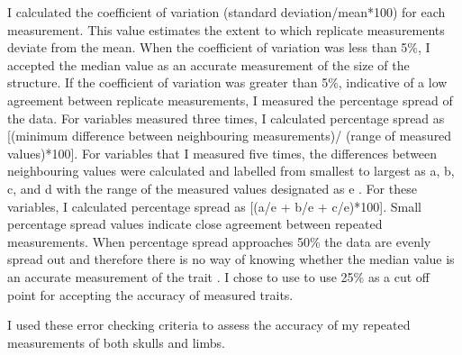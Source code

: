 	I calculated the coefficient of variation (standard deviation/mean*100) for each measurement. This value estimates the extent to which replicate measurements deviate from the mean. When the coefficient of variation was less than 5\%, I accepted the median value as an accurate measurement of the size of the structure. 
	If the coefficient of variation was greater than 5\%, indicative of a low agreement between replicate measurements, I measured the percentage spread of the data. For variables measured three times, I calculated percentage spread as [(minimum difference between neighbouring measurements)/ (range of measured values)*100].
	For variables that I measured five times, the differences between neighbouring values were calculated and labelled from smallest to largest as a, b, c, and d with the range of the measured values designated as e \citep{Cooper2009}. For these variables, I calculated percentage spread as [(a/e + b/e + c/e)*100]. 
	Small percentage spread values indicate close agreement between repeated measurements. When percentage spread approaches 50\% the data are evenly spread out and therefore there is no way of knowing whether the median value is an accurate measurement of the trait \citep{Cooper2009}. I chose to use to use 25\% as a cut off point for accepting the accuracy of measured traits.

	I used these error checking criteria to assess the accuracy of my repeated measurements of both skulls and limbs. 



\subsection{}

	 
